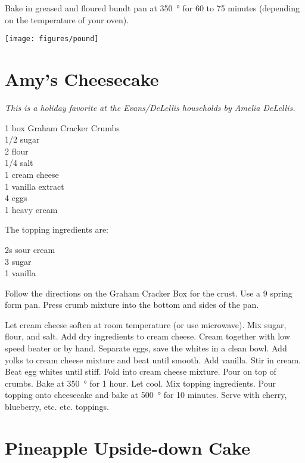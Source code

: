 Bake in greased and floured bundt pan at \SI{350}{\degree} for 60 to 75
minutes (depending on the temperature of your oven).
\begin{center}
\texttt{[image: figures/pound]}
\end{center}

\section{Amy's Cheesecake}

\textit{This is a holiday favorite at the Evans/DeLellis households by Amelia
  DeLellis.}
\begin{ingredients}
  1 box Graham Cracker Crumbs \\
  \SI{1/2}{\cup} sugar \\
  \SI{2}{\tblspoon}  flour \\
  \SI{1/4}{\teaspoon}  salt \\
  \SI{1}{\pound} cream cheese \\
  \SI{1}{\teaspoon}  vanilla extract \\
  4 eggs \\
  \SI{1}{\cup} heavy cream
\end{ingredients}
The topping ingredients are:
\begin{ingredients}
  \SI{2}{\cup}s sour cream \\
  \SI{3}{\tblspoon}  sugar \\
  \SI{1}{\teaspoon} vanilla
\end{ingredients}
Follow the directions on the Graham Cracker Box for the crust.  Use a
\SI{9}{\inch} spring form pan.  Press crumb mixture into the bottom and sides
of the pan.

Let cream cheese soften at room temperature (or use microwave).  Mix sugar,
flour, and salt.  Add dry ingredients to cream cheese.  Cream together with
low speed beater or by hand.  Separate eggs, save the whites in a clean bowl.
Add yolks to cream cheese mixture and beat until smooth.  Add vanilla.  Stir
in cream.  Beat egg whites until stiff.  Fold into cream cheese mixture.  Pour
on top of crumbs.  Bake at \SI{350}{\degree} for 1 hour.  Let cool.  Mix
topping ingredients.  Pour topping onto cheesecake and bake at
\SI{500}{\degree} for 10 minutes.  Serve with cherry, blueberry,
etc. etc. toppings.

\section{Pineapple Upside-down Cake}

